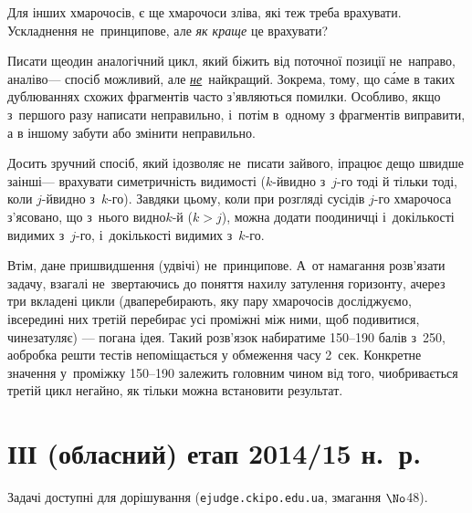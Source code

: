 \documentclass[14pt,a4paper]{extarticle}
\begin{document}
Для інших хмарочосів, є ще хмарочоси зліва, які теж треба врахувати. Ускладнення не~принципове, але \emph{як краще} це врахувати?

Писати ще\nolinebreak[3] один аналогічний цикл, який біжить від поточної позиції не~направо, а\nolinebreak[3] наліво\nolinebreak[3] --- спосіб можливий, але \underline{\emph{не}}~найкращий. Зокрема, тому, що с\'{а}ме в таких дублюваннях схожих фрагментів часто з'являються помилки. Особливо, якщо з~першого разу написати неправильно, і~потім в~одному з фрагментів виправити, а в іншому забути або змінити неправильно.

Досить зручний спосіб, який і\nolinebreak[3] дозволяє не~писати зайвого, і\nolinebreak[3] працює дещо швидше за\nolinebreak[2] інші\nolinebreak[3] --- врахувати симетричність видимості (\mbox{$k$-й}\nolinebreak[3] видно з~\mbox{$j$-го} тоді й тільки тоді, коли \mbox{$j$-й}\nolinebreak[3] видно з~\mbox{$k$-го}). Завдяки цьому, коли при розгляді сусідів \mbox{$j$-го} хмарочоса з'ясовано, що з~нього видно\nolinebreak[2] \mbox{$k$-й} (${k{>}j}$), можна додати по\nolinebreak[3] одиничці і~до\nolinebreak[2] кількості видимих з~\mbox{$j$-го}, і~до\nolinebreak[2] кількості видимих з~\mbox{$k$-го}.

Втім, дане пришвидшення (удвічі) не~принципове. А~от намагання розв'язати задачу, взагалі не~звертаючись до поняття нахилу затулення горизонту, а\nolinebreak[3] через три вкладені цикли (два\nolinebreak[3] перебирають, яку пару хмарочосів досліджуємо, і\nolinebreak[3] всередині них третій перебирає усі проміжні між ними, щоб подивитися, чи\nolinebreak[2] не\nolinebreak[3] затуляє) --- погана ідея. Такий розв’язок набиратиме 150--190 балів з~250, а\nolinebreak[3] обробка решти тестів не\nolinebreak[3] поміщається у обмеження часу 2~сек. Конкретне значення у~проміжку 150--190 залежить головним чином від того, чи\nolinebreak[3] обривається третій цикл негайно, як тільки можна встановити результат. 






\section{ІІІ (обласний) етап 2014/15 н.~р.}

Задачі доступні для дорішування (\verb"ejudge.ckipo.edu.ua", змагання $\No$48).

\renewenvironment{problemAllDefault}[1]{\vspace{10mm}\par\begin{problem}{#1}{Клавіатура (stdin) або файл input.txt}{Екран (stdout) або файл output.txt}{1 сек}{64 мегабайти}}{\end{problem}}
\end{document}
